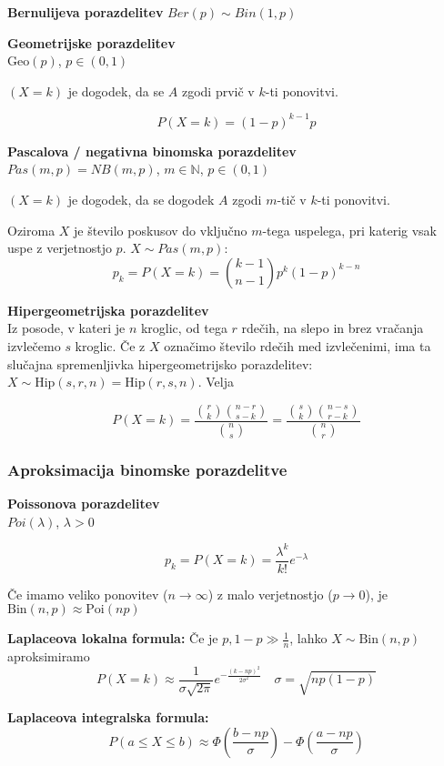 \begin{multicols}{4}
\textbf{Bernulijeva porazdelitev} $Ber(p) \sim Bin(1, p)$

\textbf{Geometrijske porazdelitev} \\
$\text{Geo}(p)$,  $p \in (0,1)$

$(X = k)$ je dogodek, da se $A$ zgodi prvič v $k$-ti ponovitvi.

\[P(X = k) = (1-p)^{k-1} p\]

\textbf{Pascalova / negativna binomska porazdelitev} \\
$Pas(m, p) = NB(m, p)$, $m \in \mathbb{N}$, $p \in (0,1)$

$(X = k)$ je dogodek, da se dogodek $A$ zgodi $m$-tič v $k$-ti ponovitvi.

Oziroma $X$ je število poskusov do vključno $m$-tega uspelega, pri katerig vsak uspe z verjetnostjo $p$. $X \sim Pas(m, p)$:
\[ p_k = P(X = k) = \binom{k-1}{n-1} p^k (1-p)^{k-n}\]

\textbf{Hipergeometrijska porazdelitev} \\
Iz posode, v kateri je $n$ kroglic, od tega $r$ rdečih, na slepo in brez vračanja
izvlečemo $s$ kroglic. Če z $X$ označimo število rdečih med izvlečenimi, ima
ta slučajna spremenljivka hipergeometrijsko porazdelitev: $X \sim \text{Hip}(s, r, n) = \text{Hip}(r, s, n)$. Velja

\[ P(X = k) = \frac{\binom{r}{k} \binom{n-r}{s-k}}{\binom{n}{s}} = \frac{\binom{s}{k} \binom{n-s}{r-k}}{\binom{n}{r}}\]


\subsubsection{Aproksimacija binomske porazdelitve}
\textbf{Poissonova porazdelitev} \\
$Poi(\lambda)$, $\lambda > 0$

\[ p_k = P(X = k) = \frac{\lambda^k}{k!} e^{-\lambda}\]

Če imamo veliko ponovitev ($n \to \infty$) z malo verjetnostjo ($p \to 0$), je $\text{Bin}(n, p) \approx \text{Poi}(np)$

\textbf{Laplaceova lokalna formula: }
Če je $p, 1-p \gg \frac{1}{n}$, lahko $X \sim \text{Bin}(n, p)$ aproksimiramo
\[ P(X = k) \approx \frac{1}{\sigma\sqrt{2\pi}} e^{-\frac{(k-np)^2}{2\sigma^2}} \quad \sigma = \sqrt{np(1-p)} \]

\textbf{Laplaceova integralska formula: }
\[ P(a \leq X \leq b) \approx \Phi\left( \frac{b - np}{\sigma} \right) - \Phi\left( \frac{a - np}{\sigma} \right) \]


\end{multicols}
